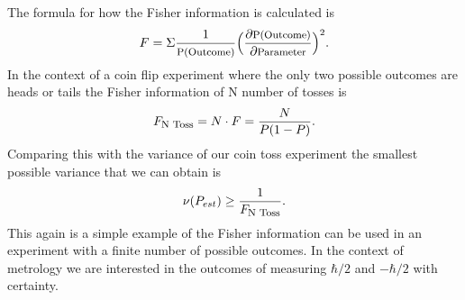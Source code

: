\documentclass[twocolumn]{article}
\begin{document}
The formula for how the Fisher information is calculated is 
\begin{equation}
F=\Sigma\frac{1}{\text{\footnotesize{P(Outcome)}}}\Big(\frac{\partial \text{\footnotesize{P(Outcome)}}}{\partial\text{\footnotesize{Parameter}}}\Big)^2.
\end{equation}
In the context of a coin flip experiment where the only two possible outcomes are heads or tails the Fisher information of N number of tosses is
\begin{equation}
F_{\text{\footnotesize{N Toss}}}=N\cdot F=\frac{N}{P(1-P)}.
\end{equation}
Comparing this with the variance of our coin toss experiment the smallest possible variance that we can obtain is
\begin{equation}
\nu(P_{est})\geq\frac{1}{F_{\text{\footnotesize{N Toss}}}}.
\end{equation}
This again is a simple example of the Fisher information can be used in an experiment with a finite number of possible outcomes. In the context of metrology we are interested in the outcomes of measuring $\hbar/2$ and $-\hbar/2$ with certainty.
\end{document}
